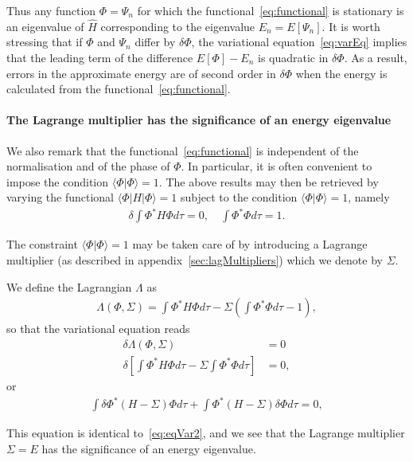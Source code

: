 Thus any function $\Phi=\Psi_n$ for which the functional~\ref{eq:functional} is stationary is an eigenvalue of $\hat{H}$ corresponding to the eigenvalue $E_n=E[\Psi_n]$. It is worth stressing that if $\Phi$ and $\Psi_n$ differ by $\delta \Phi$, the variational equation~\ref{eq:varEq} implies that the leading term of the difference $E[\Phi]-E_n$ is quadratic in $\delta \Phi$. As a result, errors in the approximate energy are of second order in $\delta \Phi$ when the energy is calculated from the functional~\ref{eq:functional}.

\paragraph{The Lagrange multiplier has the significance of an energy eigenvalue}
\label{sec:LagEig}
We also remark that the functional~\ref{eq:functional} is independent of the normalisation and of the phase of $\Phi$. In particular, it is often convenient to impose the condition $\langle \Phi | \Phi \rangle=1$. The above results may then be retrieved by varying the functional $\langle \Phi |H| \Phi \rangle=1$ subject to the condition $\langle \Phi | \Phi \rangle=1$, namely
\begin{align*}
 \delta \int  \Phi^* H\Phi d \tau = 0, \quad \int  \Phi^* \Phi d \tau = 1.
\end{align*}

The constraint $\langle \Phi | \Phi \rangle=1$ may be taken care of by introducing a Lagrange multiplier (as described in appendix~\ref{sec:lagMultipliers}) which we denote by $\varSigma$.

We define the Lagrangian $\Lambda$ as
\begin{align*}
  \Lambda(\Phi,\varSigma) = \int  \Phi^* H\Phi d \tau - \varSigma \left( \int  \Phi^* \Phi d \tau -1 \right),
\end{align*}
 so that the variational equation reads
\begin{align}
\label{diffLagrangian}
 \delta \Lambda(\Phi,\varSigma) &= 0 \\
 \delta \left[ \int  \Phi^* H\Phi d \tau - \varSigma \int  \Phi^* \Phi d \tau  \right] &= 0, 
\end{align}
or
\begin{align*}
\int   \delta  \Phi^* (H-\varSigma) \Phi d \tau + \int  \Phi^*  (H-\varSigma) \delta \Phi d \tau= 0, 
\end{align*}

This equation is identical to~\ref{eq:eqVar2}, and we see that the Lagrange multiplier $\varSigma=E$ has the significance of an energy eigenvalue.

